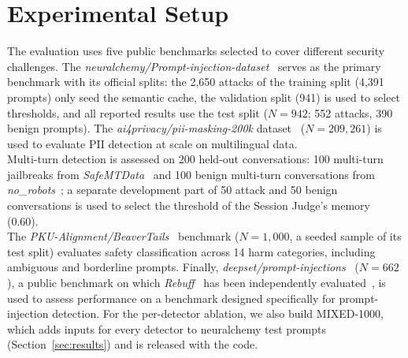 \documentclass[runningheads]{llncs}
\newif\ifrev
\newcommand{\rev}[1]{\ifrev\hl{#1}\else#1\fi}                  %
\begin{document}
\section{Experimental Setup} \label{sec:setup}
The evaluation uses five public benchmarks selected to cover different security challenges. The \textit{neuralchemy/Prompt-injection-dataset}~\cite{neuralchemy} serves as the primary benchmark \rev{with its official splits: the 2,650 attacks of the training split (4,391 prompts) only seed the semantic cache, the validation split (941) is used to select thresholds, and all reported results use the test split ($N=942$; 552 attacks, 390 benign prompts)}.
The \textit{ai4privacy/pii-masking-200k} dataset~\cite{ai4privacy} ($N=209{,}261$) is used to evaluate PII detection at scale on multilingual data.\\
\rev{Multi-turn detection is assessed on 200 held-out conversations: 100 multi-turn jailbreaks from \textit{SafeMTData}~\cite{safemtdata} and 100 benign multi-turn conversations from \textit{no\_robots}~\cite{norobots}; a separate development part of 50 attack and 50 benign conversations is used to select the threshold of the Session Judge's memory (0.60).} \\
The \textit{PKU-Alignment/BeaverTails}~\cite{beavertails} benchmark
(\rev{$N=1{,}000$, a seeded sample of its test split}) evaluates safety classification across 14 harm categories, including ambiguous and borderline prompts. Finally, \textit{deepset/prompt-injections}~\cite{deepset} \rev{($N=662$)}, \rev{a public benchmark on which} \textit{Rebuff}~\cite{rebuff} \rev{has been independently evaluated~\cite{palit2025}}, is used to assess performance on a benchmark
designed specifically for prompt-injection detection. \rev{For the per-detector ablation, we also build MIXED-1000, which adds inputs for every detector to neuralchemy test prompts (Section~\ref{sec:results}) and is released with the code.}
\end{document}
